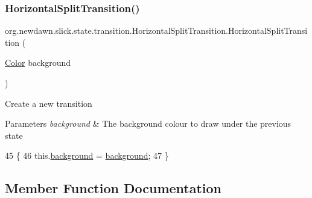 \subsubsection{\texorpdfstring{Horizontal\+Split\+Transition()}{HorizontalSplitTransition()}\hspace{0.1cm}{\footnotesize\ttfamily [2/2]}}
{\footnotesize\ttfamily org.\+newdawn.\+slick.\+state.\+transition.\+Horizontal\+Split\+Transition.\+Horizontal\+Split\+Transition (\begin{DoxyParamCaption}\item[{\mbox{\hyperlink{classorg_1_1newdawn_1_1slick_1_1_color}{Color}}}]{background }\end{DoxyParamCaption})\hspace{0.3cm}{\ttfamily [inline]}}

Create a new transition


\begin{DoxyParams}{Parameters}
{\em background} & The background colour to draw under the previous state \\
\hline
\end{DoxyParams}

\begin{DoxyCode}
45                                                        \{
46         this.\mbox{\hyperlink{classorg_1_1newdawn_1_1slick_1_1state_1_1transition_1_1_horizontal_split_transition_a9f2e988c706773e93ad1472d85c5b229}{background}} = \mbox{\hyperlink{classorg_1_1newdawn_1_1slick_1_1state_1_1transition_1_1_horizontal_split_transition_a9f2e988c706773e93ad1472d85c5b229}{background}};
47     \}
\end{DoxyCode}


\subsection{Member Function Documentation}
\mbox{\label{classorg_1_1newdawn_1_1slick_1_1state_1_1transition_1_1_horizontal_split_transition_aafaf7629dd26bcc698861152d1552c83}} 
